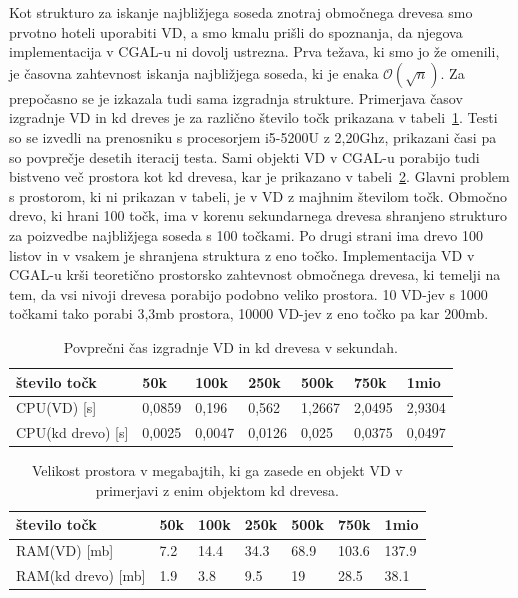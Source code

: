 \documentclass[a4paper, 12pt]{book}
\newcommand{\OO}{\ensuremath{\mathcal{O}}} %
\begin{document}
Kot strukturo za iskanje najbližjega soseda znotraj območnega drevesa smo prvotno hoteli uporabiti VD, a smo kmalu prišli do spoznanja, da njegova implementacija v CGAL-u ni dovolj ustrezna. Prva težava, ki smo jo že omenili, je časovna zahtevnost iskanja najbližjega soseda, ki je enaka $\OO(\sqrt{n})$. Za prepočasno se je izkazala tudi sama izgradnja strukture. Primerjava časov izgradnje VD in kd dreves je za različno število točk prikazana v tabeli~\ref{cpu-compare}. Testi so se izvedli na prenosniku s procesorjem i5-5200U z 2,20Ghz, prikazani časi pa so povprečje desetih iteracij testa. Sami objekti VD v CGAL-u porabijo tudi bistveno več prostora kot kd drevesa, kar je prikazano v tabeli~\ref{ram_compare}. Glavni problem s prostorom, ki ni prikazan v tabeli, je v VD z majhnim številom točk. Območno drevo, ki hrani 100 točk, ima v korenu sekundarnega drevesa shranjeno strukturo za poizvedbe najbližjega soseda s 100 točkami. Po drugi strani ima drevo 100 listov in v vsakem je shranjena struktura z eno točko. Implementacija VD v CGAL-u krši teoretično prostorsko zahtevnost območnega drevesa, ki temelji na tem, da vsi nivoji drevesa porabijo podobno veliko prostora. 10 VD-jev s 1000 točkami tako porabi 3,3mb prostora, 10000 VD-jev z eno točko pa kar 200mb.

\begin{table}
\begin{center}
\begin{tabular}{l|l|l|l|l|l|l}
\hline
število točk & 50k & 100k & 250k & 500k & 750k & 1mio \\ \hline \hline
CPU(VD) [s] & 0,0859 & 0,196 & 0,562 & 1,2667 & 2,0495 & 2,9304 \\ \hline
CPU(kd drevo) [s] & 0,0025 & 0,0047 & 0,0126 & 0,025 & 0,0375 & 0,0497
\end{tabular}
\caption{Povprečni čas izgradnje VD in kd drevesa v sekundah.}
\label{cpu-compare}
\end{center}
\end{table}

\begin{table}
\begin{center}
\begin{tabular}{l|l|l|l|l|l|l}
število točk & 50k & 100k & 250k & 500k & 750k & 1mio \\ \hline \hline
RAM(VD) [mb] & 7.2 & 14.4 & 34.3 & 68.9 & 103.6 & 137.9 \\ \hline
RAM(kd drevo) [mb] & 1.9 & 3.8 & 9.5 & 19 & 28.5 & 38.1
\end{tabular}
\caption{Velikost prostora v megabajtih, ki ga zasede en objekt VD v primerjavi z enim objektom kd drevesa.}
\label{ram_compare}
\end{center}
\end{table}
\end{document}
